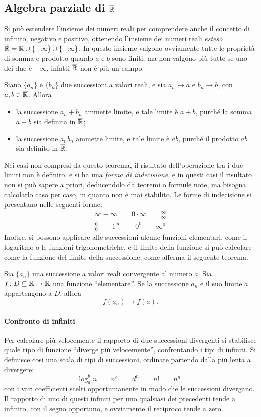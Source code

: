 \subsection{Algebra parziale di $\overline{\mathbb{R}}$}
Si può estendere l'insieme dei numeri reali per comprendere anche il concetto di infinito, negativo e positivo, ottenendo l'insieme dei numeri reali \emph{esteso} $\overline{\mathbb{R}}=\mathbb{R}\cup\{-\infty\}\cup\{+\infty\}$. In questo insieme valgono ovviamente tutte le proprietà di somma e prodotto quando $a$ e $b$ sono finiti, ma non valgono più tutte se uno dei due è $\pm\infty$, infatti $\overline{\mathbb{R}}$ non è più un campo.

\begin{teorema}
Siano $\{a_n\}$ e $\{b_n\}$ due successioni a valori reali, e sia $a_n\to a$ e $b_n\to b$, con $a,b\in\overline{\mathbb{R}}$. Allora
\begin{itemize}
	\item la successione $a_n+b_n$ ammette limite, e tale limite è $a+b$, purché la somma $a+b$ sia definita in $\overline{\mathbb{R}}$;
	\item la successione $a_nb_n$ ammette limite, e tale limite è $ab$, purché il prodotto $ab$ sia definito in $\overline{\mathbb{R}}$.
\end{itemize}
\end{teorema}
Nei casi non compresi da questo teorema, il risultato dell'operazione tra i due limiti non è definito, e si ha una \emph{forma di indecisione}, e in questi casi il risultato non si può sapere a priori, deducendolo da teoremi o formule note, ma bisogna calcolarlo caso per caso, in quanto non è mai stabilito. Le forme di indecisione si presentano nelle seguenti forme:
\begin{gather*}
\infty-\infty\qquad 0\cdot\infty\qquad\frac{\infty}{\infty}\\
\frac00\qquad 1^\infty\qquad 0^0\qquad \infty^0
\end{gather*}
Inoltre, si possono applicare alle successioni alcune funzioni elementari, come il logaritmo o le funzioni trigonometriche, e il limite della funzione si può calcolare come la funzione del limite della successione, come afferma il seguente teorema.
\begin{teorema}
Sia $\{a_n\}$ una successione a valori reali convergente al numero $a$. Sia $f\colon D\subseteq\mathbb{R}\to\mathbb{R}$ una funzione ``elementare''. Se la successione $a_n$ e il suo limite $a$ appartengono a $D$, allora
\[
f(a_n)\to f(a).
\]
\end{teorema}

\paragraph{Confronto di infiniti}
Per calcolare più velocemente il rapporto di due successioni divergenti si stabilisce quale tipo di funzione ``diverge più velocemente'', confrontando i tipi di infiniti. Si definisce così una scala di tipi di successioni, ordinate partendo dalla più lenta a divergere:
\[
\log_a^b n\qquad n^c\qquad d^n\qquad n!\qquad n^n,
\]
con i vari coefficienti scelti opportumanente in modo che le successioni divergano. Il rapporto di uno di questi infiniti per uno qualsiasi dei precedenti tende a infinito, con il segno opportuno, e ovviamente il reciproco tende a zero.

